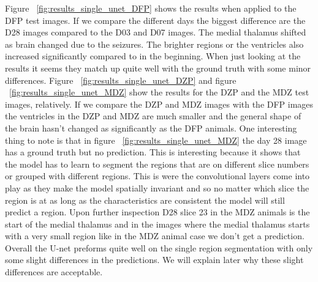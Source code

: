     Figure ~\ref{fig:results_single_unet_DFP} shows the results when applied to the DFP test images. 
    If we compare the different days the biggest difference are the D28 images compared to the D03 and D07 images. 
    The medial thalamus shifted as brain changed due to the seizures. 
    The brighter regions or the ventricles also increased significantly compared to in the beginning. 
    When just looking at the results it seems they match up quite well with the ground truth with some minor differences. 
    Figure ~\ref{fig:results_single_unet_DZP} and figure ~\ref{fig:results_single_unet_MDZ} show the results for the DZP and the MDZ test images, relatively.
    If we compare the DZP and MDZ images with the DFP images the ventricles in the DZP and MDZ are much smaller and the general shape of the brain hasn't changed as significantly as the DFP animals.
    One interesting thing to note is that in figure ~\ref{fig:results_single_unet_MDZ} the day 28 image has a ground truth but no prediction. 
    This is interesting because it shows that the model has to learn to segment the regions that are on different slice numbers or grouped with different regions. 
    This is were the convolutional layers come into play as they make the model spatially invariant and so no matter which slice the region is at as long as the characteristics are consistent the model will still predict a region. 
    Upon further inspection D28 slice 23 in the MDZ animals is the start of the medial thalamus and in the images where the medial thalamus starts with a very small region like in the MDZ animal case we don't get a prediction. 
    Overall the U-net preforms quite well on the single region segmentation with only some slight differences in the predictions. 
    We will explain later why these slight differences are acceptable. 
    

